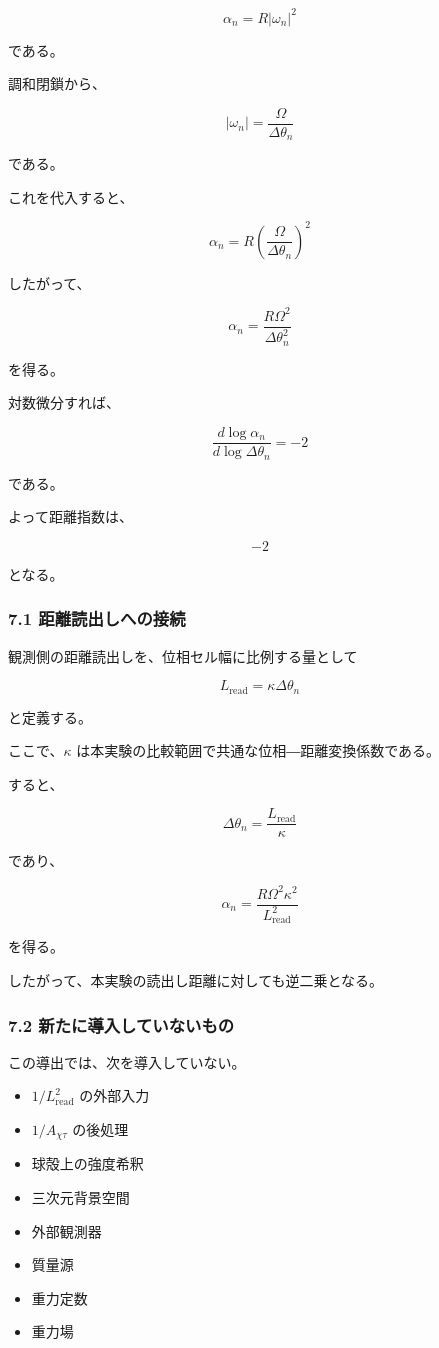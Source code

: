 \documentclass[
  a4paper,
]{ltjsarticle}
\providecommand{\tightlist}{%
  \setlength{\itemsep}{0pt}\setlength{\parskip}{0pt}}
\begin{document}
\[
\alpha_n=R|\omega_n|^2
\]

である。

調和閉鎖から、

\[
|\omega_n|
=\frac{\Omega}{\Delta\theta_n}
\]

である。

これを代入すると、

\[
\alpha_n
=R\left(\frac{\Omega}{\Delta\theta_n}\right)^2
\]

したがって、

\[
\boxed{
\alpha_n
=\frac{R\Omega^2}{\Delta\theta_n^2}
}
\]

を得る。

対数微分すれば、

\[
\frac{d\log\alpha_n}
{d\log\Delta\theta_n}
=-2
\]

である。

よって距離指数は、

\[
\boxed{-2}
\]

となる。

\subsubsection{7.1
距離読出しへの接続}\label{ux8dddux96e2ux8aadux51faux3057ux3078ux306eux63a5ux7d9a}

観測側の距離読出しを、位相セル幅に比例する量として

\[
L_{\mathrm{read}}
=\kappa\Delta\theta_n
\]

と定義する。

ここで、\(\kappa\) は本実験の比較範囲で共通な位相―距離変換係数である。

すると、

\[
\Delta\theta_n
=\frac{L_{\mathrm{read}}}{\kappa}
\]

であり、

\[
\boxed{
\alpha_n
=\frac{R\Omega^2\kappa^2}
{L_{\mathrm{read}}^2}
}
\]

を得る。

したがって、本実験の読出し距離に対しても逆二乗となる。

\subsubsection{7.2
新たに導入していないもの}\label{ux65b0ux305fux306bux5c0eux5165ux3057ux3066ux3044ux306aux3044ux3082ux306e}

この導出では、次を導入していない。

\begin{itemize}
\tightlist
\item
  \(1/L_{\mathrm{read}}^2\) の外部入力
\item
  \(1/A_{\chi\tau}\) の後処理
\item
  球殻上の強度希釈
\item
  三次元背景空間
\item
  外部観測器
\item
  質量源
\item
  重力定数
\item
  重力場
\end{itemize}
\end{document}
